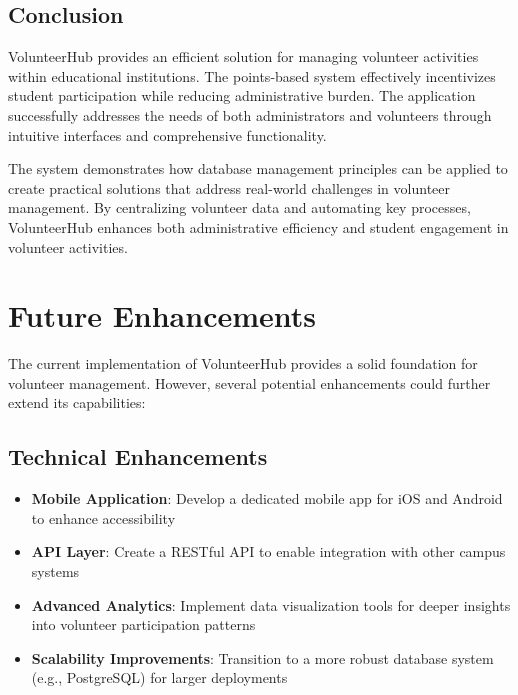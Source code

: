 \documentclass[12pt,a4paper]{report}
\begin{document}
\section{Conclusion}
VolunteerHub provides an efficient solution for managing volunteer activities within educational institutions. The points-based system effectively incentivizes student participation while reducing administrative burden. The application successfully addresses the needs of both administrators and volunteers through intuitive interfaces and comprehensive functionality.

The system demonstrates how database management principles can be applied to create practical solutions that address real-world challenges in volunteer management. By centralizing volunteer data and automating key processes, VolunteerHub enhances both administrative efficiency and student engagement in volunteer activities.

\chapter{Future Enhancements}

The current implementation of VolunteerHub provides a solid foundation for volunteer management. However, several potential enhancements could further extend its capabilities:

\section{Technical Enhancements}
\begin{itemize}
    \item \textbf{Mobile Application}: Develop a dedicated mobile app for iOS and Android to enhance accessibility
    \item \textbf{API Layer}: Create a RESTful API to enable integration with other campus systems
    \item \textbf{Advanced Analytics}: Implement data visualization tools for deeper insights into volunteer participation patterns
    \item \textbf{Scalability Improvements}: Transition to a more robust database system (e.g., PostgreSQL) for larger deployments
\end{itemize}
\end{document}
